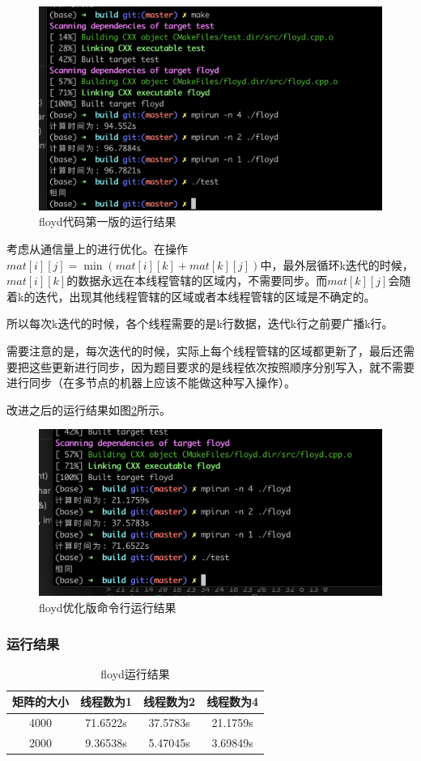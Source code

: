 \documentclass[10pt]{article}
\begin{document}
\begin{figure}[htbp]
    \centering
    \includegraphics[width=.6\textwidth]{assets/floyd命令行运行界面.png}
    \caption{floyd代码第一版的运行结果}
    \label{floyd代码第一版的运行结果}
\end{figure}

考虑从通信量上的进行优化。在操作$mat[i][j] = \min(mat[i][k] + mat[k][j])$中，最外层循环k迭代的时候，$mat[i][k]$的数据永远在本线程管辖的区域内，不需要同步。而$mat[k][j]$会随着k的迭代，出现其他线程管辖的区域或者本线程管辖的区域是不确定的。

所以每次k迭代的时候，各个线程需要的是k行数据，迭代k行之前要广播k行。

需要注意的是，每次迭代的时候，实际上每个线程管辖的区域都更新了，最后还需要把这些更新进行同步，因为题目要求的是线程依次按照顺序分别写入，就不需要进行同步（在多节点的机器上应该不能做这种写入操作）。

改进之后的运行结果如图\ref{floyd优化版命令行运行结果}所示。

\begin{figure}[htbp]
    \centering
    \includegraphics[width=.6\textwidth]{assets/floyd第二版命令行运行结果.png}
    \caption{floyd优化版命令行运行结果}
    \label{floyd优化版命令行运行结果}
\end{figure}



\subsubsection{运行结果}


\begin{table}[htbp]
    \centering
    \caption{floyd运行结果}
        \begin{tabular}{c|c|c|c}
        \hline
        矩阵的大小 & 线程数为1 & 线程数为2 & 线程数为4 \\
        \hline
        4000 & 71.6522s & 37.5783s & 21.1759s \\
        2000 & 9.36538s & 5.47045s & 3.69849s \\
        \hline
        \end{tabular}
    \label{label}
\end{table}
\end{document}
